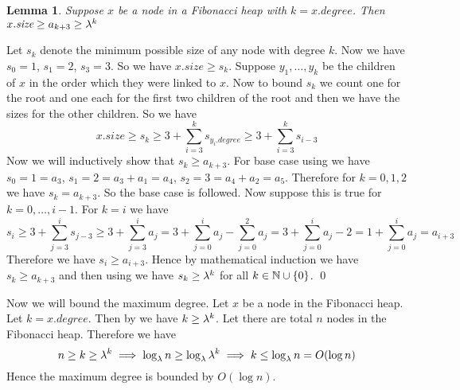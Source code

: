 \documentclass[a4paper, 11pt]{article}
\newtheorem{lemma}{Lemma}
\renewenvironment{proof}{\noindent{\it \textbf{Proof:}}\hspace*{1em}}{\qed\bigskip\\}
\begin{document}
{\begin{lemma}\label{lem3}
	Suppose $x$ be a node in a Fibonacci heap with $k=x.\textit{degree}$.  Then $x.\textit{size}\geq a_{k+3}\geq\lambda^k$
\end{lemma}
\begin{proof}
	Let $s_k$ denote the minimum possible size of any node with degree $k$. Now we have $s_0=1$, $s_1=2$, $s_3=3$. So we have $x.\textit{size}\geq s_k$. Suppose $y_1,\dots, y_k$ be the children of $x$ in the order which they were linked to $x$. Now  to bound $s_k$ we count one for the root and one each for the first two children of the root and then we have the sizes for the other children. So we have $$x.\textit{size}\geq s_k\geq 3+\sum_{i=3}^k s_{y_i.\textit{degree}}\geq 3+\sum_{i=3}^k s_{i-3}$$Now we will inductively show that $s_k\geq a_{k+3}$. For base case using  we have $s_0=1=a_3$, $s_1=2=a_3+a_1=a_4$, $s_2=3=a_4+a_2=a_5$. Therefore for $k=0,1,2$ we have $s_k=a_{k+3}$. So the base case is followed. Now suppose this is true for $k=0,\dots, i-1$. For $k=i$ we have $$s_i\geq 3+\sum_{j=3}^is_{j-3}\geq 3+\sum_{j=3}^i a_{j}=3+\sum_{j=0}^i a_{j}-\sum_{j=0}^2a_j=3+\sum_{j=0}^ia_j-2=1+\sum_{j=0}^ia_j=a_{i+3}$$Therefore we have $s_i\geq a_{i+3}$. Hence by mathematical induction we have $s_k\geq a_{k+3}$ and then using  we have $s_k\geq \lambda^k$ for all $k\in\mathbb{N}\cup \{0\}$.
\end{proof}

Now we will bound the maximum degree. Let $x$ be a node in the Fibonacci heap. Let $k=x.\textit{degree}$.  Then by  we have $k\geq \lambda^k$. Let there are total $n$ nodes in the Fibonacci heap. Therefore we have $$n\geq k\geq \lambda^k\implies \log_{\lambda}n\geq \log_{\lambda}\lambda^k\implies k\leq \log_{\lambda}n=O(\log n)$$Hence the maximum degree is bounded by $O(\log n)$. 
}


\end{document}
